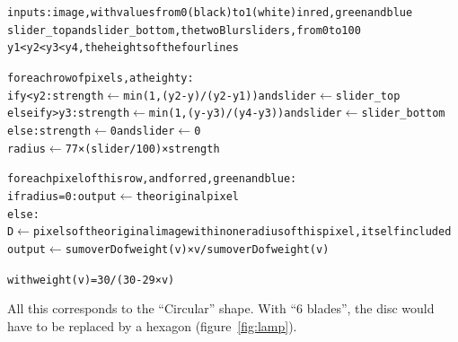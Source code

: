 \documentclass[10pt,a4paper]{article}
\begin{document}
{\small
\begin{alltt}
inputs: image, with values from 0 (black) to 1 (white) in red, green and blue
        slider_top and slider_bottom, the two Blur sliders, from 0 to 100
        y1 < y2 < y3 < y4, the heights of the four lines

for each row of pixels, at height y:
    if y < y2:        strength \(\leftarrow\) min(1, (y2 - y) / (y2 - y1))  and  slider \(\leftarrow\) slider_top
    else if y > y3:   strength \(\leftarrow\) min(1, (y - y3) / (y4 - y3))  and  slider \(\leftarrow\) slider_bottom
    else:             strength \(\leftarrow\) 0  and  slider \(\leftarrow\) 0
    radius \(\leftarrow\) 77 × (slider / 100) × strength

    for each pixel of this row, and for red, green and blue:
        if radius = 0: output \(\leftarrow\) the original pixel
        else:
            D \(\leftarrow\) pixels of the original image within one radius of this pixel, itself included
            output \(\leftarrow\) sum over D of weight(v) × v  /  sum over D of weight(v)

with weight(v) = 30 / (30 - 29 × v)
\end{alltt}
}

All this corresponds to the ``Circular'' shape. With ``6 blades'', the disc would have to be replaced by a hexagon (figure~\ref{fig:lamp}).
\end{document}
